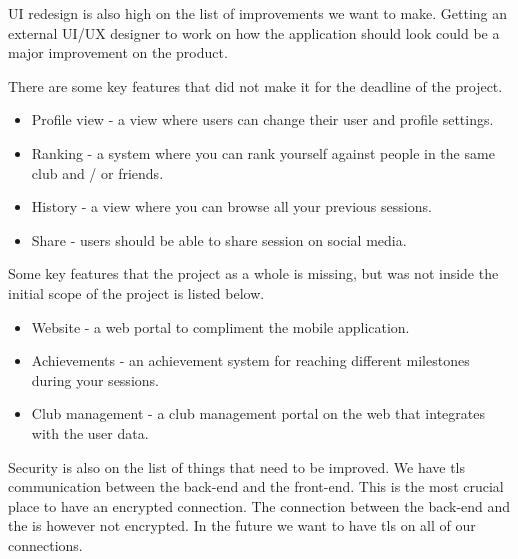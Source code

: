 UI redesign is also high on the list of improvements we want to make.
Getting an external UI/UX designer to work on how the application should look could be a major improvement on the product.

There are some key features that did not make it for the deadline of the project.
\begin{itemize}  
\item Profile view - a view where users can change their user and profile settings.
\item Ranking - a system where you can rank yourself against people in the same club and / or friends.
\item History - a view where you can browse all your previous sessions.
\item Share - users should be able to share session on social media.
\end{itemize}

Some key features that the project as a whole is missing, but was not inside the initial scope of the project is listed below.
\begin{itemize}  
\item Website - a web portal to compliment the mobile application.
\item Achievements - an achievement system for reaching different milestones during your sessions.
\item Club management - a club management portal on the web that integrates with the user data.
\end{itemize}

Security is also on the list of things that need to be improved. 
We have \gls{tls} communication between the back-end and the front-end. 
This is the most crucial place to have an encrypted connection. 
The connection between the back-end and the  is however not encrypted. 
In the future we want to have \gls{tls} on all of our connections.
